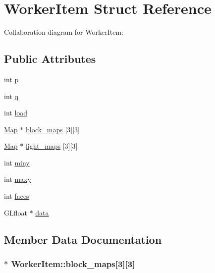 \hypertarget{structWorkerItem}{}\section{Worker\+Item Struct Reference}
\label{structWorkerItem}


Collaboration diagram for Worker\+Item\+:
\subsection*{Public Attributes}
\begin{DoxyCompactItemize}
\item 
int \hyperlink{structWorkerItem_a56f8195e12033bf669e3543ac37035bf}{p}
\item 
int \hyperlink{structWorkerItem_aca226a9caa91a2d8d8705681767607b2}{q}
\item 
int \hyperlink{structWorkerItem_a82cdbfb0c2a6f0de3fd05a514da724d5}{load}
\item 
\hyperlink{structMap}{Map} $\ast$ \hyperlink{structWorkerItem_a01e7ce1680490053e0fd7816ee9ceb04}{block\+\_\+maps} \mbox{[}3\mbox{]}\mbox{[}3\mbox{]}
\item 
\hyperlink{structMap}{Map} $\ast$ \hyperlink{structWorkerItem_ac7e3900b71b86f43e953e69c5f64dc51}{light\+\_\+maps} \mbox{[}3\mbox{]}\mbox{[}3\mbox{]}
\item 
int \hyperlink{structWorkerItem_a368c07bd7512c33c2af234b01feb2000}{miny}
\item 
int \hyperlink{structWorkerItem_a230160dce9a2c4bfdbfe56491a7734a1}{maxy}
\item 
int \hyperlink{structWorkerItem_a4ba610cef58e6b92862a44796ae63a50}{faces}
\item 
G\+Lfloat $\ast$ \hyperlink{structWorkerItem_af30032f39cbd48ca5bb7cc09deab7d1b}{data}
\end{DoxyCompactItemize}


\subsection{Member Data Documentation}
\subsubsection[{\texorpdfstring{block\+\_\+maps}{block_maps}}]{$\ast$ Worker\+Item\+::block\+\_\+maps\mbox{[}3\mbox{]}\mbox{[}3\mbox{]}}\hypertarget{structWorkerItem_a01e7ce1680490053e0fd7816ee9ceb04}{}\label{structWorkerItem_a01e7ce1680490053e0fd7816ee9ceb04}
